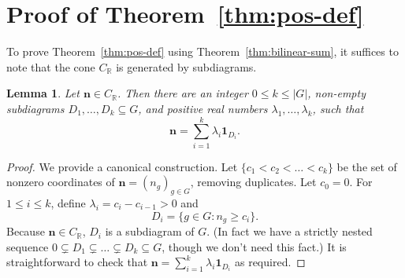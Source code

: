 \documentclass[11pt,reqno]{amsart}
\newtheorem{lemma}[theorem]{Lemma}
\theoremstyle{remark}
\begin{document}
\section{Proof of Theorem~\ref{thm:pos-def}}
To prove Theorem~\ref{thm:pos-def} using Theorem~\ref{thm:bilinear-sum}, it suffices to note that the cone $C_\mathbb{R}$ is generated by subdiagrams.
\begin{lemma}\label{lem:decompose}
    Let $\mathbf{n}\in C_{\mathbb{R}}$. Then there are an integer $0\leq k \leq |G|$, non-empty subdiagrams $D_1,\dots,D_k\subseteq G$, and positive real numbers $\lambda_1,\dots,\lambda_k$, such that
    \[ \mathbf{n}=\sum_{i=1}^k \lambda_i \mathbf{1}_{D_i}.\]
\end{lemma}
\begin{proof}
    We provide a canonical construction. Let $\{c_1<c_2<\dots<c_k\}$ be the set of nonzero coordinates of $\mathbf{n}=(n_g)_{g\in G}$, removing duplicates. Let $c_0=0$. For $1\leq i\leq k$, define $\lambda_i=c_i-c_{i-1}>0$ and
    \[ D_i=\{ g\in G:n_g\geq c_i \}.\]
    Because $\mathbf{n}\in C_{\mathbb{R}}$, $D_i$ is a subdiagram of $G$. (In fact we have a strictly nested sequence $0\subsetneq D_1\subsetneq \dots \subsetneq D_k\subseteq G$, though we don't need this fact.) It is straightforward to check that $\mathbf{n}=\sum_{i=1}^k \lambda_i \mathbf{1}_{D_i}$ as required.
\end{proof}
\end{document}
